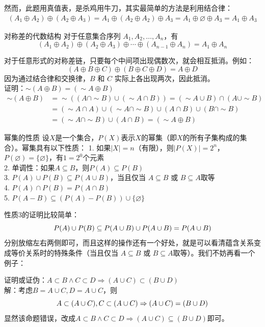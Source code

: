 然而，此题用真值表，是杀鸡用牛刀，其实最简单的方法是利用结合律：
\begin{align*}
(A_1 \oplus A_2) \oplus (A_2 \oplus A_3) = A_1 \oplus (A_2 \oplus A_2) \oplus A_3 = A_1 \oplus \varnothing \oplus A_3  = A_1 \oplus A_3 
\end{align*}
\begin{theorem}{对称差的代数结构}{}
    对于任意集合序列 $A_1, A_2, \ldots, A_n$，有\vspace{-10pt}
$$(A_1 \oplus A_2) \oplus (A_2 \oplus A_3) \oplus \cdots \oplus (A_{n-1} \oplus A_n) = A_1 \oplus A_n$$
\end{theorem}
对于任意形式的对称差链，只要每个中间项出现偶数次，就会相互抵消。例如：
$$(A \oplus B \oplus C) \oplus (B \oplus C \oplus D) = A \oplus D$$
因为通过结合律和交换律，$B$ 和 $C$ 实际上各出现两次，因此抵消。\\
证明：$\sim(A \oplus B) = (\sim A \oplus B)$
\begin{align*}
      \sim(A \oplus B) &= \sim((A\cap \sim B) \cup (\sim A \cap B))=(\sim A\cup B)\cap (A\cup \sim B) \\
      &=(\sim A\cap A)\cup(\sim A\cap\sim B)\cup(A\cap B)\cup(B\cap\sim B)\\
      &=(\sim A\cap\sim B)\cup(A\cap B)= (\sim A \oplus B)
\end{align*}
\begin{theorem}{幂集的性质}{}
设$X$是一个集合，$P(X)$表示$X$的幂集（即$X$的所有子集构成的集合）。幂集具有以下性质：
1. 如果$|X| = n$（有限），则$|P(X)| = 2^n$，$P(\varnothing) = \{\varnothing\}$，有$1 = 2^0$个元素\\
2. 单调性：如果$A \subseteq B$，则$P(A) \subseteq P(B)$\\
3. $P(A) \cup P(B) \subseteq P(A \cup B)$，当且仅当 $A \subseteq B$ 或 $B \subseteq A$取等\\
4. $P(A) \cap P(B) = P(A \cap B)$\\
5. $ P(A - B) \subseteq (P(A) - P(B))\cup\{\varnothing\}$
\end{theorem}
性质3的证明比较简单：\vspace{-10pt}
\[P(A) \cup P(B) \subseteq P(A \cup B)\cup P(A\cup B)=P(A\cup B)\vspace{-10pt}\]
分别放缩左右两侧即可，而且这样的操作还有一个好处，就是可以看清蕴含关系变成等价关系时的特殊条件（当且仅当 $A \subseteq B$ 或 $B \subseteq A$取等）。我们不妨再看一个例子：

证明或证伪：$A\subset B\land C\subset D\Rightarrow (A\cup C)\subset (B\cup D)$\\
解：考虑$B=A\cup C,D=A\cup C$，则
\vspace{-10pt}\[A\subset(A\cup C),C\subset(A\cup C)\Rightarrow (A\cup C)=(B\cup D)\vspace{-10pt}\]显然该命题错误，改成$A\subset B\land C\subset D\Rightarrow (A\cup C)\subseteq (B\cup D)$即可。

